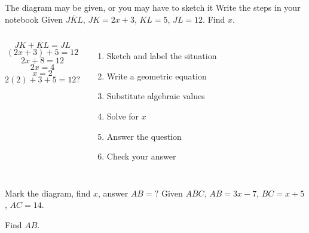 \begin{frame}{The diagram may be given, or you may have to sketch it}
  {Write the steps in your notebook}
  Given $\overline{JKL}$, $JK=2x+3$, $KL=5$, $JL=12$. Find ${x}$.
    \begin{center}
    \end{center}
    \begin{columns}[]{}
        \[JK+KL=JL\]
        \[(2x+3)+5=12\]
        \[2x+8=12\]
        \[2x=4\]
        \[x=2\]
        \[2(2)+3+5=12?\]
        \begin{enumerate}
            \item Sketch and label the situation
            \item Write a geometric equation
            \item Substitute algebraic values
            \item Solve for $x$
            \item Answer the question
            \item \alert{Check} your answer
        \end{enumerate}
      \end{columns}
    \end{frame}

\begin{frame}{Mark the diagram, find $x$, answer $AB=?$}
  Given $\overline{ABC}$, $AB=3x-7$, $BC=x+5$, $AC=14$. \vspace{1cm}
  \begin{center}
  \end{center} 
  Find ${AB}$.\vspace{3cm}
  \end{frame}

